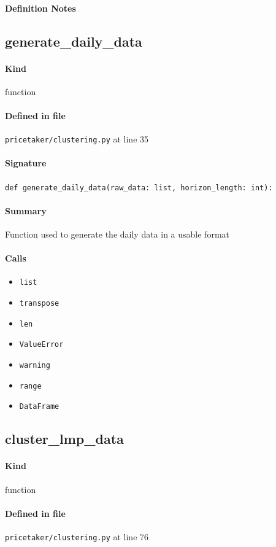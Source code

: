 \documentclass[11pt]{report}
\begin{document}
\paragraph{Definition Notes}
\subsection{generate\_daily\_data}
\label{def:pricetaker-clustering.py:generate_daily_data:L35}
\paragraph{Kind} function
\paragraph{Defined in file} \texttt{pricetaker/clustering.py} at line 35
\paragraph{Signature} \texttt{def generate\_daily\_data(raw\_data: list, horizon\_length: int):}
\paragraph{Summary} Function used to generate the daily data in a usable format
\paragraph{Calls}
\begin{itemize}[leftmargin=*]
  \item \texttt{list}
  \item \texttt{transpose}
  \item \texttt{len}
  \item \texttt{ValueError}
  \item \texttt{warning}
  \item \texttt{range}
  \item \texttt{DataFrame}
\end{itemize}
\subsection{cluster\_lmp\_data}
\label{def:pricetaker-clustering.py:cluster_lmp_data:L76}
\paragraph{Kind} function
\paragraph{Defined in file} \texttt{pricetaker/clustering.py} at line 76
\end{document}
